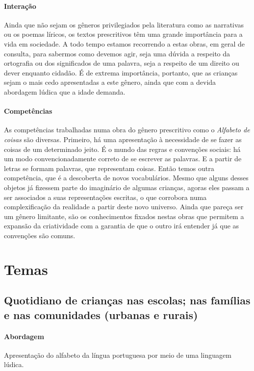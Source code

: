 \documentclass[11pt]{extarticle}
\begin{document}
\paragraph{Interação} 
Ainda que não sejam os gêneros privilegiados pela literatura
como as narrativas ou os poemas líricos, os textos prescritivos
têm uma grande importância para a vida em sociedade. A todo 
tempo estamos recorrendo a estas obras, em geral de consulta, para
sabermos como devemos agir, seja uma dúvida a respeito da ortografia ou 
dos significados de uma palavra, seja a respeito de um direito ou dever
enquanto cidadão. É de extrema importância, portanto, que as crianças
sejam o mais cedo apresentadas a este gênero, ainda que com a 
devida abordagem lúdica que a idade demanda. 

\paragraph{Competências} 
As competências trabalhadas numa obra do gênero prescritivo como o 
\emph{Alfabeto de coisas} são diversas. 
Primeiro, há uma apresentação à necessidade de se fazer as coisas de um 
determinado jeito. É o mundo das regras e convenções sociais: há um modo 
convencionadamente correto de se escrever as palavras. E a partir de letras 
se formam palavras, que representam coisas. Então temos outra competência, 
que é a descoberta de novos vocabulários. Mesmo que alguns desses objetos já 
fizessem parte do imaginário de algumas crianças, agoras eles passam
a ser associados a suas representações escritas, o que corrobora numa 
complexificação da realidade a partir deste novo universo. Ainda que 
pareça ser um gênero limitante, são os conhecimentos fixados nestas obras 
que permitem a expansão da criatividade com a garantia de que o outro irá 
entender já que as convenções são comuns.

\section{Temas}

\subsection{Quotidiano de crianças nas escolas; nas famílias e nas comunidades (urbanas e rurais)}

\paragraph{Abordagem} 
Apresentação do alfabeto da língua portuguesa por meio de uma linguagem lúdica. 
\end{document}

